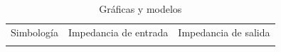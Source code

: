\documentclass[10pt]{article}
\begin{document}
\begin{table}
\begin{tabular}{|p{}|p{}|p{}|}
		Simbología                                                                                      & Impedancia de entrada                                                                          & Impedancia de salida \\
		                                                                                                &                                                                                                                       \\
		\hline
	\end{tabular}
	\caption{Gráficas y modelos}
\end{table}
\end{document}

